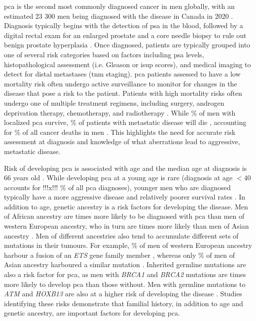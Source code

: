\Gls{pca} is the second most commonly diagnosed cancer in men globally, with an estimated 23 300 men being diagnosed with the disease in Canada in 2020 \cite{brayGlobalCancerStatistics2018,brennerProjectedEstimatesCancer2020}.
Diagnosis typically begins with the detection of \gls{psa} in the blood, followed by a digital rectal exam for an enlarged prostate and a core needle biopsy to rule out benign prostate hyperplasia \cite{}.
Once diagnosed, patients are typically grouped into one of several risk categories based on factors including \gls{psa} levels, histopathological assessment (i.e. Gleason or \gls{isup} scores), and medical imaging to detect for distal metastases (\gls{tnm} staging)\cite{}.
\Gls{pca} patients assessed to have a low mortality risk often undergo active surveillance to monitor for changes in the disease that pose a risk to the patient.
Patients with high mortality risks often undergo one of multiple treatment regimens, including surgery, androgen deprivation therapy, chemotherapy, and radiotherapy \cite{}.
While  \% of men with localized \gls{pca} survive,  \% of patients with metastatic disease will die \cite{}, accounting for  \% of all cancer deaths in men \cite{brennerProjectedEstimatesCancer2020}.
This highlights the need for accurate risk assessment at diagnosis and knowledge of what aberrations lead to aggressive, metastatic disease.

Risk of developing \gls{pca} is associated with age and the median age at diagnosis is 66 years old \cite{}.
While developing \gls{pca} at a young age is rare (diagnosis at age $< 40$ accounts for !!!x!!! \% of all \gls{pca} diagnoses), younger men who are diagnosed typically have a more aggressive disease and relatively poorer survival rates \cite{}.
In addition to age, genetic ancestry is a risk factors for developing the disease.
Men of African ancestry are  times more likely to be diagnosed with \gls{pca} than men of western European ancestry, who in turn are  times more likely than men of Asian ancestry \cite{}.
Men of different ancestries also tend to accumulate different sets of mutations in their tumours.
For example,  \% of men of western European ancestry harbour a fusion of an \emph{ETS} gene family member \cite{fraserGenomicHallmarksLocalized2017}, whereas only  \% of men of Asian ancestry harboured a similar mutation \cite{liGenomicEpigenomicAtlas2020}.
Inherited germline mutations are also a risk factor for \gls{pca}, as men with \emph{BRCA1} and \emph{BRCA2} mutations are  times more likely to develop \gls{pca} than those without.
Men with germline mutations to \emph{ATM} and \emph{HOXB13} are also at a higher risk of developing the disease \cite{}.
Studies identifying these risks demonstrate that familial history, in addition to age and genetic ancestry, are important factors for developing \gls{pca}.

